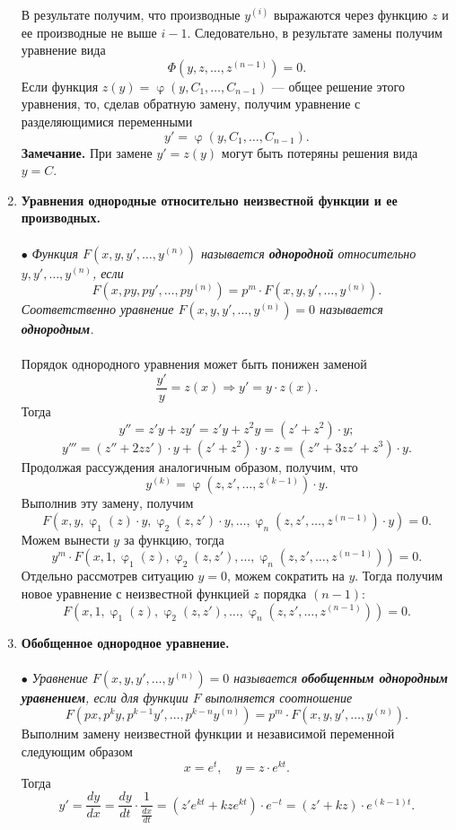 \documentclass[a4paper, 12pt]{report}
\newcommand{\FI}{\Phi}
\renewcommand{\varphi}{\upvarphi}
\begin{document}
\begin{enumerate}
 В результате получим, что производные $y^{(i)}$ выражаются через функцию $z$ и ее производные не выше $i-1$. Следовательно, в результате замены получим уравнение вида $$\FI(y,z,\ldots, z^{(n-1)}) = 0.$$
 Если функция $z(y) = \varphi(y, C_1,\ldots, C_{n-1})$ --- общее решение этого уравнения, то, сделав обратную замену, получим уравнение с разделяющимися переменными $$y' =  \varphi(y, C_1,\ldots, C_{n-1}).$$
 \textbf{Замечание.} При замене $y'=z(y)$ могут быть потеряны решения вида $y = C$.
 \item \textbf{Уравнения однородные относительно неизвестной функции и ее производных.}\\\\
 $\bullet$ \textit{Функция $F(x,y,y',\ldots, y^{(n)})$ называется \textbf{однородной} относительно $y,y',\ldots, y^{(n)}$, если $$F(x,py,py',\ldots, py^{(n)}) = p^m\cdot F(x,y,y',\ldots, y^{(n)}).$$ Соответственно уравнение $F(x,y,y',\ldots, y^{(n)}) = 0$ называется \textbf{однородным}.}\\\\
 Порядок однородного уравнения может быть понижен заменой $$\dfrac{y'}{y} = z(x) \Rightarrow y' = y\cdot z(x).$$
 Тогда $$y'' = z'y + zy' = z'y + z^2 y = (z' + z^2)\cdot y;$$
 $$y''' = (z'' + 2zz')\cdot y + (z' + z^2)\cdot y \cdot z = (z'' + 3zz' + z^3)\cdot y.$$
Продолжая рассуждения аналогичным образом, получим, что $$y^{(k)} = \varphi(z,z',\ldots, z^{(k-1)})\cdot y.$$
Выполнив эту замену, получим $$F(x,y,\varphi_1(z)\cdot y, \varphi_2(z,z')\cdot y,\ldots, \varphi_n(z,z',\ldots, z^{(n-1)})\cdot y) = 0.$$
Можем вынести $y$ за функцию, тогда $$y^m\cdot F(x,1, \varphi_1(z), \varphi_2(z,z'),\ldots, \varphi_n(z,z',\ldots, z^{(n-1)})) = 0.$$
Отдельно рассмотрев ситуацию $y= 0 $, можем сократить на $y$. Тогда получим новое уравнение с неизвестной функцией $z$ порядка $(n-1)$:$$F(x,1, \varphi_1(z), \varphi_2(z,z'),\ldots, \varphi_n(z,z',\ldots, z^{(n-1)})) = 0.$$ 
\item \textbf{Обобщенное однородное уравнение.}\\\\
$\bullet$ \textit{Уравнение $F(x, y, y',\ldots, y^{(n)}) = 0$ называется \textbf{обобщенным однородным уравнением}, если для функции $F$ выполняется соотношение} $$F(px, p^ky , p^{k-1}y',\ldots, p^{k-n}y^{(n)}) = p^m\cdot F(x, y, y',\ldots, y^{(n)}).$$
Выполним замену неизвестной функции и независимой переменной следующим образом $$x = e^t,\quad y = z\cdot e^{kt}.$$
Тогда $$y' = \dfrac{dy}{dx} = \dfrac{dy}{dt}\cdot \dfrac{1}{\frac{dx}{dt}} = (z'e^{kt} + k ze^{kt})\cdot e^{-t} = (z' + kz)\cdot e^{(k-1)t}.$$

\end{enumerate}
\end{document}
